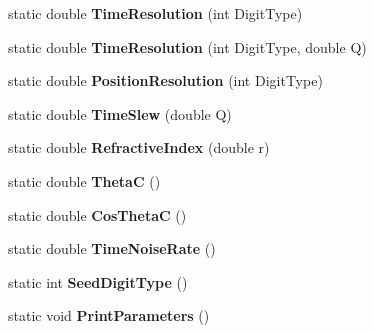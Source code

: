 \begin{DoxyCompactItemize}
\item 
\hypertarget{classParameters_a4a79efe76cdd7f76870e71936f3bc006}{
static double {\bfseries TimeResolution} (int DigitType)}
\label{classParameters_a4a79efe76cdd7f76870e71936f3bc006}

\item 
\hypertarget{classParameters_a96b3aa83418fef97061a4e7647343989}{
static double {\bfseries TimeResolution} (int DigitType, double Q)}
\label{classParameters_a96b3aa83418fef97061a4e7647343989}

\item 
\hypertarget{classParameters_ac6f65898fef36531ed9fddf04708b577}{
static double {\bfseries PositionResolution} (int DigitType)}
\label{classParameters_ac6f65898fef36531ed9fddf04708b577}

\item 
\hypertarget{classParameters_aecd4991eb52328637dc849c04e254d0f}{
static double {\bfseries TimeSlew} (double Q)}
\label{classParameters_aecd4991eb52328637dc849c04e254d0f}

\item 
\hypertarget{classParameters_ad4f2815a0e46ecdd573fda40d3ef4710}{
static double {\bfseries RefractiveIndex} (double r)}
\label{classParameters_ad4f2815a0e46ecdd573fda40d3ef4710}

\item 
\hypertarget{classParameters_a6feb77688ce48e84f5450332552c348b}{
static double {\bfseries ThetaC} ()}
\label{classParameters_a6feb77688ce48e84f5450332552c348b}

\item 
\hypertarget{classParameters_a87680cdd958e703d73854700fb675a73}{
static double {\bfseries CosThetaC} ()}
\label{classParameters_a87680cdd958e703d73854700fb675a73}

\item 
\hypertarget{classParameters_aa5c5a5e9cfbc338de62e659de1950543}{
static double {\bfseries TimeNoiseRate} ()}
\label{classParameters_aa5c5a5e9cfbc338de62e659de1950543}

\item 
\hypertarget{classParameters_a5c88994da52292b5474849482a524a72}{
static int {\bfseries SeedDigitType} ()}
\label{classParameters_a5c88994da52292b5474849482a524a72}

\item 
\hypertarget{classParameters_a07f0ae805cea2c93da65f5f0e9e7fc21}{
static void {\bfseries PrintParameters} ()}
\label{classParameters_a07f0ae805cea2c93da65f5f0e9e7fc21}

\end{DoxyCompactItemize}
